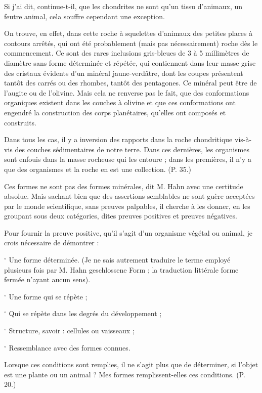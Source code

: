 \documentclass[a4paper, 12pt, oneside, french]{book}
\begin{document}
\og Si j'ai dit, continue-t-il, que les chondrites ne sont qu'un tissu d'animaux, un feutre animal, cela souffre cependant une exception. \fg

\og On trouve, en effet, dans cette roche à squelettes d'animaux des petites places à contours arrêtés, qui ont été probablement (mais pas nécessairement) roche dès le commencement. Ce sont des rares inclusions gris-bleues de 3 à 5 millimètres de diamètre sans forme déterminée et répétée, qui contiennent dans leur masse grise des cristaux évidents d'un minéral jaune-verdâtre, dont les coupes présentent tantôt des carrés ou des rhombes, tantôt des pentagones. Ce minéral peut être de l'augite ou de l'olivine. Mais cela ne renverse pas le fait, que des conformations organiques existent dans les couches à olivine et que ces conformations ont engendré la construction des corps planétaires, qu'elles ont composés et construits. \fg

\og Dans tous les cas, il y a inversion des rapports dans la roche chondritique vis-à-vis des couches sédimentaires de notre terre. Dans ces dernières, les organismes sont enfouis dans la masse rocheuse qui les entoure ; dans les premières, il n'y a que des organismes et la roche en est une collection. \fg (P. 35.)

\og Ces formes ne sont pas des formes minérales, \fg dit M. Hahn avec une certitude absolue. Mais sachant bien que des assertions semblables ne sont guère acceptées par le monde scientifique, sans preuves palpables, il cherche à les donner, en les groupant sous deux catégories, dites preuves positives et preuves négatives.

\og Pour fournir la preuve positive, qu'il s'agit d'un organisme végétal ou animal, je crois nécessaire de démontrer :

$^{\circ}$ Une forme déterminée. \fg (Je ne sais autrement traduire le terme employé plusieurs fois par M. Hahn \og geschlossene Form \fg ; la traduction littérale \og forme fermée \fg n'ayant aucun sens).

$^{\circ}$ Une forme qui se répète ;

$^{\circ}$ Qui se répète dans les degrés du développement ;

$^{\circ}$ Structure, savoir : cellules ou vaisseaux ;

$^{\circ}$ Ressemblance avec des formes connues.

\og Lorsque ces conditions sont remplies, il ne s'agit plus que de déterminer, si l'objet est une plante ou un animal ? Mes formes remplissent-elles ces conditions. \fg (P. 20.)
\end{document}
